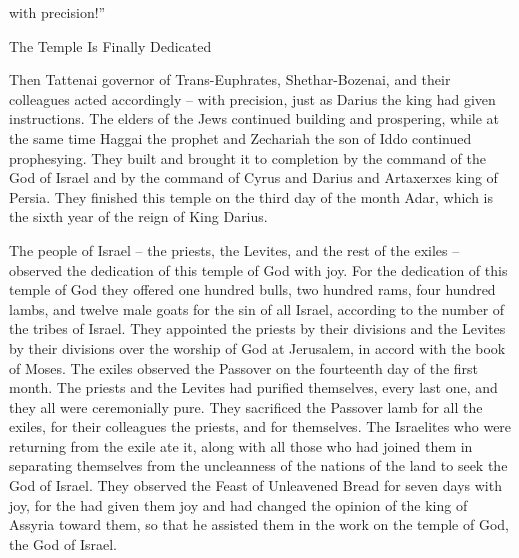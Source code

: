 {with precision!”
\par }{\SH The Temple Is Finally Dedicated
\par }{\PP {}Then
Tattenai
governor
of Trans-Euphrates,
Shethar-Bozenai,
and their colleagues
acted
accordingly
– with precision,
just as
Darius
the king
had given instructions.
The elders
of the Jews
continued building
and prospering,
while at the same time Haggai
the prophet
and Zechariah
the son
of Iddo
continued prophesying.
They built
and brought
it to completion
by
the command
of the God
of Israel
and by the command
of Cyrus
and Darius
and Artaxerxes
king
of Persia.
They finished
this
temple
on
the third
day
of the month
Adar,
which
is
the sixth
year
of the reign
of King
Darius.
\par }{\PP {}The people
of Israel
– the priests,
the Levites,
and the rest of
the exiles –
observed
the dedication
of this
temple
of God
with joy.
For the dedication
of this
temple
of God
they offered
one hundred
bulls,
two hundred
rams,
four
hundred
lambs,
and twelve
male
goats
for
the sin
of all
Israel,
according to the number
of the tribes
of Israel.
They appointed
the priests
by their divisions
and the Levites
by their divisions
over
the worship
of God
at Jerusalem,
in accord with
the book
of Moses.
The exiles
observed
the Passover
on the fourteenth
day of the first
month.
The priests
and the Levites
had
purified
themselves, every
last one,
and they all
were ceremonially pure.
They sacrificed
the Passover lamb
for all
the exiles,
for their colleagues
the priests,
and for themselves.
The Israelites
who were returning
from the exile
ate
it, along with all
those who had joined them in separating
themselves from the uncleanness
of the nations
of the land
to
seek
the
{}
God
of Israel.
They observed
the Feast
of Unleavened
Bread for seven
days
with joy,
for
the {}
had given them joy
and had changed
the opinion
of the king
of Assyria
toward them,
so that he assisted
them
in the work
on the temple
of God,
the God
of Israel.

}
